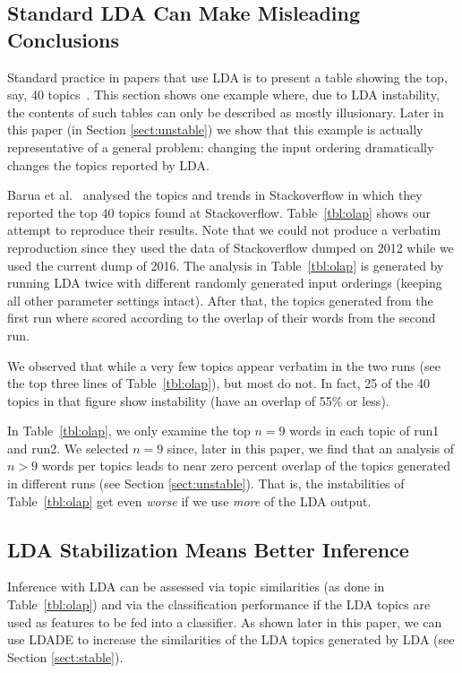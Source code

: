 \documentclass[twocolumn,5p,sort&compress]{elsarticle}
\newcommand{\tion}[1]{\ref{sect:#1}}
\theoremstyle{break}
\begin{document}
\subsection{Standard LDA Can Make Misleading Conclusions}
Standard practice in papers that use LDA is to present a table showing the top, say, 40
topics~\cite{barua2014developers}.
This section shows one example where, due to LDA instability,
the contents of such tables can only be described as  mostly illusionary.
Later in this paper (in Section \tion{unstable}) we show that this example is actually representative of
a general problem: changing the input ordering dramatically changes the topics
reported by LDA.

Barua et al.~\cite{barua2014developers}
analysed the topics and trends in Stackoverflow in which they reported the top 40 topics found at Stackoverflow. Table~\ref{tbl:olap} shows our attempt to reproduce their results.
Note that we could not produce a verbatim reproduction since they used the data of Stackoverflow dumped on 2012 while we used the current dump of 2016.
The analysis in Table~\ref{tbl:olap} is generated by running LDA twice with different
randomly generated input orderings (keeping all other parameter settings intact). After that, the topics generated from the first run where scored
according to the overlap of their words
from the second run.

We observed that while a very few topics appear verbatim in the two runs (see the top three lines of Table~\ref{tbl:olap}), but
most do not. In fact,
25 of the 40 topics in that figure show  instability (have an overlap of 55\% or less).

In Table~\ref{tbl:olap}, we only
examine the top $n=9$ words in each topic of run1 and run2. We selected \mbox{$n=9$} since,
later in this paper, we find that an analysis of \mbox{$n>9$} words per topics leads to near
 zero percent overlap of the topics generated in different runs (see Section \tion{unstable}).
That is, the instabilities of Table~\ref{tbl:olap} get even {\em worse} if we use {\em more} of the LDA output.

\subsection{LDA Stabilization Means Better Inference}

Inference with LDA can be assessed via topic similarities (as done in Table~\ref{tbl:olap}) and via the classification performance if the LDA topics are used as features to be fed into a classifier. As shown later in this paper, we can use LDADE to increase the similarities of the LDA
topics generated by LDA (see Section \tion{stable}).
\end{document}
